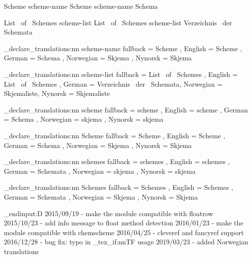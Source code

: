  {Scheme}
   {scheme-name} {Scheme}
    {scheme-name} {Schema}

 {List~ of~ Schemes}
    {scheme-list} {List~ of~ Schemes}
     {scheme-list} {Verzeichnis~ der~ Schemata}
\EndChemCompatibility

\chemmacros_declare_translations:nn {scheme-name}
  {
    fallback = Scheme ,
    English  = Scheme ,
    German   = Schema ,
    Norwegian = Skjema ,
    Nynorsk   = Skjema
  }

\chemmacros_declare_translations:nn {scheme-list}
  {
    fallback    = List~ of~ Schemes ,
    English     = List~ of~ Schemes ,
    German      = Verzeichnis~ der~ Schemata,
    Norwegian   = Skjemaliste,
    Nynorsk     = Skjemaliste
  }

\chemmacros_declare_translations:nn {scheme}
  {
    fallback  = scheme ,
    English   = scheme ,
    German    = Schema ,
    Norwegian = skjema ,
    Nynorsk   = skjema
  }

\chemmacros_declare_translations:nn {Scheme}
  {
    fallback  = Scheme ,
    English   = Scheme ,
    German    = Schema ,
    Norwegian = Skjema ,
    Nynorsk   = Skjema
  }

\chemmacros_declare_translations:nn {schemes}
  {
    fallback = schemes ,
    English  = schemes ,
    German   = Schemata ,
    Norwegian = skjema ,
    Nynorsk   = skjema
  }

\chemmacros_declare_translations:nn {Schemes}
  {
    fallback = Schemes ,
    English  = Schemes ,
    German   = Schemata ,
    Norwegian = Skjema ,
    Nynorsk   = Skjema
  }
\EndChemCompatibility

\tex_endinput:D
2015/09/19 - make the module compatible with floatrow
2015/10/23 - add info message to float method detection
2016/01/23 - make the module compatible with chemscheme
2016/04/25 - cleveref and fancyref support
2016/12/28 - bug fix: typo in \chemmacros_tex_if:nnTF usage
2019/03/23 - added Norwegian translations
